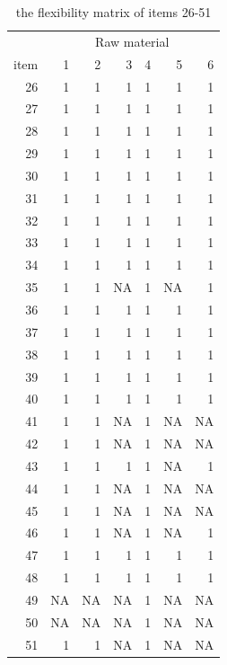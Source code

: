 \documentclass[preprint, 3p,
authoryear]{elsarticle} %
\begin{document}
\begin{table}[!h]

\caption{\label{tab:unnamed-chunk-5}the flexibility matrix of items 26-51}
\centering
\begin{tabular}[t]{r|r|r|r|r|r|r}
\hline
\multicolumn{1}{c|}{ } & \multicolumn{6}{c}{Raw material} \\
\cline{2-7}
item & 1 & 2 & 3 & 4 & 5 & 6\\
\hline
26 & 1 & 1 & 1 & 1 & 1 & 1\\
\hline
27 & 1 & 1 & 1 & 1 & 1 & 1\\
\hline
28 & 1 & 1 & 1 & 1 & 1 & 1\\
\hline
29 & 1 & 1 & 1 & 1 & 1 & 1\\
\hline
30 & 1 & 1 & 1 & 1 & 1 & 1\\
\hline
31 & 1 & 1 & 1 & 1 & 1 & 1\\
\hline
32 & 1 & 1 & 1 & 1 & 1 & 1\\
\hline
33 & 1 & 1 & 1 & 1 & 1 & 1\\
\hline
34 & 1 & 1 & 1 & 1 & 1 & 1\\
\hline
35 & 1 & 1 & NA & 1 & NA & 1\\
\hline
36 & 1 & 1 & 1 & 1 & 1 & 1\\
\hline
37 & 1 & 1 & 1 & 1 & 1 & 1\\
\hline
38 & 1 & 1 & 1 & 1 & 1 & 1\\
\hline
39 & 1 & 1 & 1 & 1 & 1 & 1\\
\hline
40 & 1 & 1 & 1 & 1 & 1 & 1\\
\hline
41 & 1 & 1 & NA & 1 & NA & NA\\
\hline
42 & 1 & 1 & NA & 1 & NA & NA\\
\hline
43 & 1 & 1 & 1 & 1 & NA & 1\\
\hline
44 & 1 & 1 & NA & 1 & NA & NA\\
\hline
45 & 1 & 1 & NA & 1 & NA & NA\\
\hline
46 & 1 & 1 & NA & 1 & NA & 1\\
\hline
47 & 1 & 1 & 1 & 1 & 1 & 1\\
\hline
48 & 1 & 1 & 1 & 1 & 1 & 1\\
\hline
49 & NA & NA & NA & 1 & NA & NA\\
\hline
50 & NA & NA & NA & 1 & NA & NA\\
\hline
51 & 1 & 1 & NA & 1 & NA & NA\\
\hline
\end{tabular}
\end{table}
\end{document}
